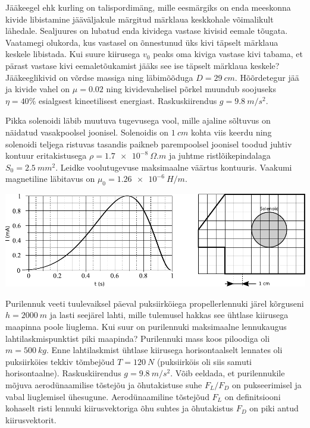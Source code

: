 \documentclass[10pt]{article}
\begin{document}
Jääkeegel ehk kurling on talispordimäng, mille eesmärgiks on enda meeskonna kivide libistamine jääväljakule märgitud märklaua keskkohale võimalikult lähedale. Sealjuures on lubatud enda kividega vastase kivisid eemale tõugata. Vaatamegi olukorda, kus vastasel on õnnestunud üks kivi täpselt märklaua keskele libistada. Kui suure kiirusega $v_0$ peaks oma kiviga vastase kivi tabama, et pärast vastase kivi eemaletõukamist jääks see ise täpselt märklaua keskele? Jääkeeglikivid on võrdse massiga ning läbimõõduga $D=\SI{29}{cm}$. Hõõrdetegur jää ja kivide vahel on $\mu = \num{0.02}$ ning kividevahelisel põrkel muundub soojuseks $\eta=40\%$ esialgsest kineetilisest energiast. Raskuskiirendus $g=\SI{9.8}{m/s^2}$.
\probend
\bigskip


Pikka solenoidi läbib muutuva tugevusega vool, mille ajaline sõltuvus on näidatud vasakpoolsel joonisel. Solenoidis on $\SI{1}{cm}$ kohta viis keerdu ning solenoidi teljega ristuvas tasandis paikneb parempoolsel joonisel toodud juhtiv kontuur
	eritakistusega $\rho=\SI{1,7e-8}{\Omega.m}$ ja juhtme ristlõikepindalaga $S_0=\SI{2,5}{mm^2}$. Leidke voolutugevuse maksimaalne väärtus kontuuris. Vaakumi magnetiline läbitavus on $\mu_0=\SI{1.26e-6}{H/m}$.
	
	\begin{center}
		\includegraphics[width=1\linewidth]{2020-lahg-05-yl.pdf}
	\end{center}
\probend
\bigskip

\setAuthor{}

Purilennuk veeti tuulevaiksel päeval puksiirköiega propellerlennuki järel kõrguseni $h = \SI{2000}{m}$ ja lasti seejärel lahti, mille tulemusel hakkas see ühtlase kiirusega maapinna poole liuglema. Kui suur on purilennuki maksimaalne lennukaugus lahtilaskmispunktist piki maapinda? Purilennuki mass koos piloodiga oli $m = \SI{500}{kg}$. Enne lahtilaskmist ühtlase kiirusega horisontaalselt lennates oli puksiirköies tekkiv tõmbejõud $T = \SI{120}{N}$ (puksiirköis oli siis samuti horisontaalne). Raskuskiirendus $g = \SI{9.8}{m/s^2}$. Võib eeldada, et purilennukile mõjuva aerodünaamilise tõstejõu ja õhutakistuse suhe $F_L/F_D$ on pukseerimisel ja vabal liuglemisel ühesugune. Aerodünaamiline tõstejõud $F_L$ on definitsiooni kohaselt risti lennuki kiirusvektoriga õhu suhtes ja õhutakistus $F_D$ on piki antud kiirusvektorit.
\probend
\bigskip
\end{document}
